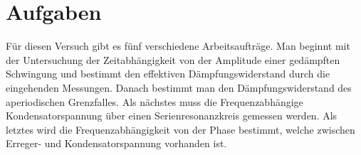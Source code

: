 \section{Aufgaben}
\label{sec: Aufgaben}

Für diesen Versuch gibt es fünf verschiedene Arbeitsaufträge. Man beginnt mit der Untersuchung der Zeitabhängigkeit von der Amplitude einer gedämpften Schwingung und bestimmt den effektiven Dämpfungswiderstand durch die eingehenden Messungen.
Danach bestimmt man den Dämpfungswiderstand des aperiodischen Grenzfalles. Als nächstes muss die Frequenzabhängige Kondensatorspannung über einen Serienresonanzkreis gemessen werden.
Als letztes wird die Frequenzabhängigkeit von der Phase bestimmt, welche zwischen Erreger- und Kondensatorspannung vorhanden ist. 





